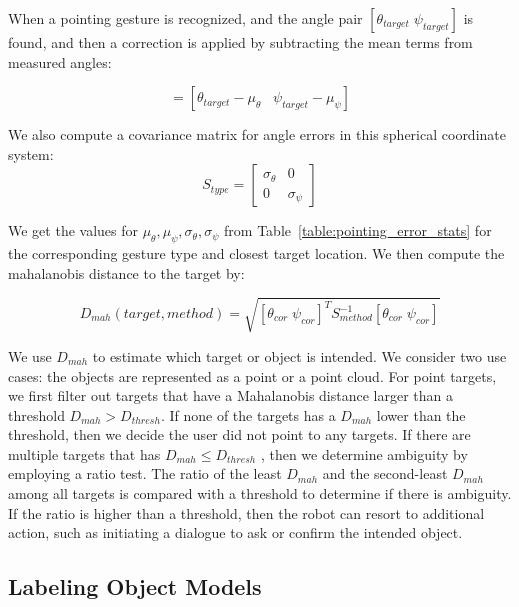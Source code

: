 \documentclass{tADR2e}
\begin{document}
When a pointing gesture is recognized, and the angle pair $[\theta_{target}\;\psi_{target}]$ is found, and then a correction is applied by subtracting the mean terms from measured angles:

\begin{equation}
[\theta_{cor}\;\;\psi_{cor}]=[\theta_{target}-\mu_{\theta}\;\;\;\psi_{target}-\mu_{\psi}]
\end{equation}
 
We also compute a covariance matrix for angle errors in this spherical coordinate system: 
\begin{equation}
S_{type} = \begin{bmatrix}
\sigma_{\theta}&0\\ 0&\sigma_{\psi}
\end{bmatrix}
\end{equation}

We get the values for $\mu_{\theta}, \mu_{\psi}, \sigma_{\theta} ,\sigma_{\psi}$ from Table~\ref{table:pointing_error_stats} for the corresponding gesture type and closest target location. We then compute the mahalanobis distance to the target by:

\begin{equation}
D_{mah}(target,method)=\sqrt{ [\theta_{cor}\;\psi_{cor}]^T S_{method}^{-1} [\theta_{cor}\;\psi_{cor}]}
\end{equation} 
 
We use $D_{mah}$ to estimate which target or object is intended. We consider two use cases: the objects are represented as a point or a point cloud. For point targets, we first filter out targets that have a Mahalanobis distance larger than a threshold $D_{mah} > D_{thresh}$. If none of the targets has a $D_{mah}$ lower than the threshold, then we decide the user did not point to any targets. If there are multiple targets that has $D_{mah} \leq D_{thresh}$ , then we determine ambiguity by employing a ratio test. The ratio of the least $D_{mah}$ and the second-least $D_{mah}$ among all targets is compared with a threshold to determine if there is ambiguity. If the ratio is higher than a threshold, then the robot can resort to additional action, such as initiating a dialogue to ask or confirm the intended object.


\subsection{Labeling Object Models}
\label{sec:object_labeling}
\end{document}

